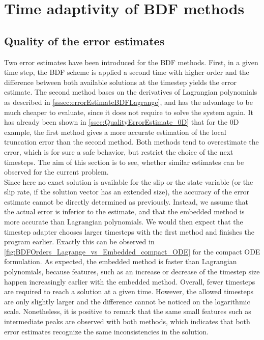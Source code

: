 \section{Time adaptivity of BDF methods}
\subsection{Quality of the error estimates}
Two error estimates have been introduced for the BDF methods. First, in a given time step, the BDF scheme is applied a second time with higher order and the difference between both available solutions at the timestep yields the error estimate. The second method bases on the derivatives of Lagrangian polynomials as described in \autoref{sssec:errorEstimateBDFLagrange}, and has the advantage to be much cheaper to evaluate, since it does not require to solve the system again. It has already been shown in \autoref{ssec:QualityErrorEstimate_0D} that for the 0D example, the first method gives a more accurate estimation of the local truncation error than the second method. Both methods tend to overestimate the error, which is for sure a safe behavior, but restrict the choice of the next timesteps. The aim of this section is to see, whether similar estimates can be observed for the current problem. \\
Since here no exact solution is available for the slip or the state variable (or the slip rate, if the solution vector has an extended size), the accuracy of the error estimate cannot be directly determined as previously. Instead, we assume that the actual error is inferior to the estimate, and that the embedded method is more accurate than Lagrangian polynomials. We would then expect that the timestep adapter chooses larger timesteps with the first method and finishes the program earlier. Exactly this can be observed in \autoref{fig:BDFOrders_Lagrange_vs_Embedded_compact_ODE} for the compact ODE formulation. As expected, the embedded method is faster than Lagrangian polynomials, because features, such as an increase or decrease of the timestep size happen increasingly earlier with the embedded method. Overall, fewer timesteps are required to reach a solution at a given time. However, the allowed timesteps are only slightly larger and the difference cannot be noticed on the logarithmic scale. Nonetheless, it is positive to remark that the same small features such as intermediate peaks are observed with both methods, which indicates that both error estimates recognize the same inconsistencies in the solution. 

